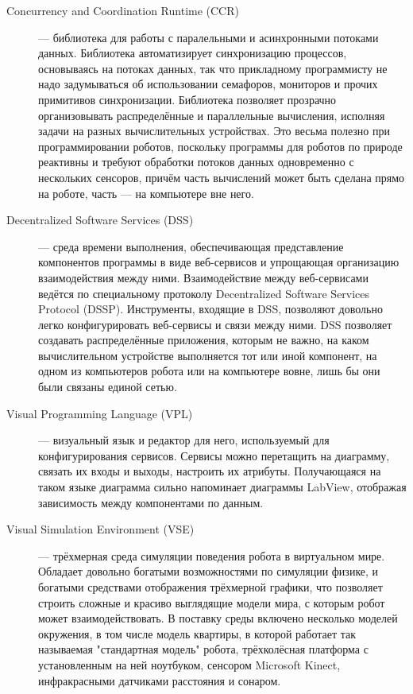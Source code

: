 \documentclass[a4paper]{article}
\begin{document}
\begin{description}
  \item[Concurrency and Coordination Runtime (CCR)] --- библиотека для работы с паралельными и асинхронными потоками данных. Библиотека автоматизирует синхронизацию процессов, основываясь на потоках данных, так что прикладному программисту не надо задумываться об использовании семафоров, мониторов и прочих примитивов синхронизации. Библиотека позволяет прозрачно организовывать распределённые и параллельные вычисления, исполняя задачи на разных вычислительных устройствах. Это весьма полезно при программировании роботов, поскольку программы для роботов по природе реактивны и требуют обработки потоков данных одновременно с нескольких сенсоров, причём часть вычислений может быть сделана прямо на роботе, часть --- на компьютере вне него.
  \item[Decentralized Software Services (DSS)] --- среда времени выполнения, обеспечивающая представление компонентов программы в виде веб-сервисов и упрощающая организацию взаимодействия между ними. Взаимодействие между веб-сервисами ведётся по специальному протоколу Decentralized Software Services Protocol (DSSP). Инструменты, входящие в DSS, позволяют довольно легко конфигурировать веб-сервисы и связи между ними. DSS позволяет создавать распределённые приложения, которым не важно, на каком вычислительном устройстве выполняется тот или иной компонент, на одном из компьютеров робота или на компьютере вовне, лишь бы они были связаны единой сетью.
  \item[Visual Programming Language (VPL)] --- визуальный язык и редактор для него, используемый для конфигурирования сервисов. Сервисы можно перетащить на диаграмму, связать их входы и выходы, настроить их атрибуты. Получающаяся на таком языке диаграмма сильно напоминает диаграммы LabView, отображая зависимость между компонентами по данным.
  \item[Visual Simulation Environment (VSE)] --- трёхмерная среда симуляции поведения робота в виртуальном мире. Обладает довольно богатыми возможностями по симуляции физике, и богатыми средствами отображения трёхмерной графики, что позволяет строить сложные и красиво выглядящие модели мира, с которым робот может взаимодействовать. В поставку среды включено несколько моделей окружения, в том числе модель квартиры, в которой работает так называемая "стандартная модель" робота, трёхколёсная платформа с установленным на ней ноутбуком, сенсором Microsoft Kinect\textregistered, инфракрасными датчиками расстояния и сонаром.
\end{description}
\end{document}
